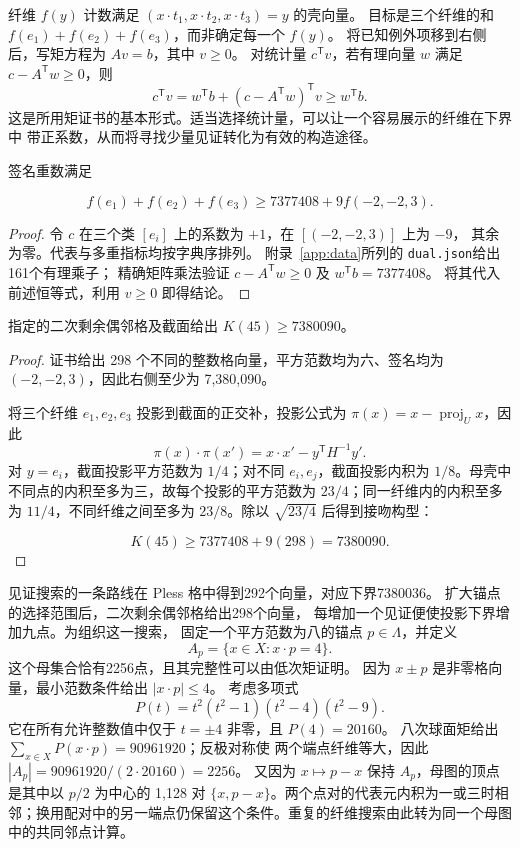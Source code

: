纤维 $f(y)$ 计数满足 $(x\cdot t_1,x\cdot t_2,x\cdot t_3)=y$ 的壳向量。
目标是三个纤维的和 $f(e_1)+f(e_2)+f(e_3)$，而非确定每一个 $f(y)$。
将已知例外项移到右侧后，写矩方程为 $Av=b$，其中 $v\ge0$。
对统计量 $c^{\mathsf T}v$，若有理向量 $w$ 满足 $c-A^{\mathsf T}w\ge0$，则
\[
c^{\mathsf T}v=w^{\mathsf T}b+(c-A^{\mathsf T}w)^{\mathsf T}v
\ge w^{\mathsf T}b.
\]
这是所用矩证书的基本形式。适当选择统计量，可以让一个容易展示的纤维在下界中
带正系数，从而将寻找少量见证转化为有效的构造途径。

\begin{proposition}[纤维的正贡献]
\label{prop:moment45}
签名重数满足

\[
f(e_1)+f(e_2)+f(e_3)
\ge7377408+9f(-2,-2,3).
\]
\end{proposition}
\begin{proof}
令 $c$ 在三个类 $[e_i]$ 上的系数为 $+1$，在 $[(-2,-2,3)]$ 上为 $-9$，
其余为零。代表与多重指标均按字典序排列。
附录~\ref{app:data}所列的 \texttt{dual.json}给出161个有理乘子；
精确矩阵乘法验证 $c-A^{\mathsf T}w\ge0$ 及 $w^{\mathsf T}b=7377408$。
将其代入前述恒等式，利用 $v\ge0$ 即得结论。
\end{proof}

\begin{corollary}[45维构造]
\label{cor:section45}
指定的二次剩余偶邻格及截面给出 $K(45)\ge7380090$。
\end{corollary}
\begin{proof}
证书给出 298 个不同的整数格向量，平方范数均为六、签名均为
\((-2,-2,3)\)，因此右侧至少为 7,380,090。

将三个纤维 \(e_1,e_2,e_3\) 投影到截面的正交补，投影公式为 $\pi(x)=x-\operatorname{proj}_{U}x$，因此
\[
\pi(x)\cdot\pi(x')=x\cdot x'-y^{\mathsf T}H^{-1}y'.
\]
对 $y=e_i$，截面投影平方范数为 $1/4$；对不同 $e_i,e_j$，截面投影内积为
$1/8$。母壳中不同点的内积至多为三，故每个投影的平方范数为
\(23/4\)；同一纤维内的内积至多为 \(11/4\)，不同纤维之间至多为
\(23/8\)。除以 \(\sqrt{23/4}\) 后得到接吻构型：

\[
K(45)\ge7377408+9(298)=7380090.
\]
\end{proof}

见证搜索的一条路线在 Pless 格中得到292个向量，对应下界7380036。
扩大锚点的选择范围后，二次剩余偶邻格给出298个向量，
每增加一个见证便使投影下界增加九点。为组织这一搜索，
固定一个平方范数为八的锚点 $p\in\Lambda$，并定义
\[
A_p=\{x\in X:x\cdot p=4\}.
\]
这个母集合恰有2256点，且其完整性可以由低次矩证明。
因为 $x\pm p$ 是非零格向量，最小范数条件给出 $|x\cdot p|\le4$。
考虑多项式
\[
P(t)=t^2(t^2-1)(t^2-4)(t^2-9).
\]
它在所有允许整数值中仅于 $t=\pm4$ 非零，且 $P(4)=20160$。
八次球面矩给出 $\sum_{x\in X}P(x\cdot p)=90961920$；反极对称使
两个端点纤维等大，因此 $|A_p|=90961920/(2\cdot20160)=2256$。
又因为 $x\mapsto p-x$ 保持 $A_p$，母图的顶点是其中以 \(p/2\) 为中心的
1,128 对
\(\{x,p-x\}\)。两个点对的代表元内积为一或三时相邻；换用配对中的另一端点仍保留这个条件。重复的纤维搜索由此转为同一个母图中的共同邻点计算。


